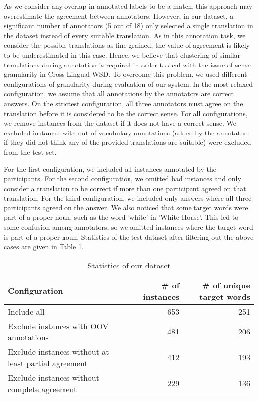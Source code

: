 {As we consider any overlap in annotated labels to be a match, this approach may overestimate the agreement between annotators. However, in our dataset, a significant number of annotators (5 out of 18) only selected a single translation in the dataset instead of every suitable translation. As in this annotation task, we consider the possible translations as  fine-grained, the value of agreement is likely to be underestimated in this case. Hence, we believe that clustering of similar translations during annotation is required in order to deal with the issue of sense granularity in Cross-Lingual WSD. To overcome this problem, we used different configurations of granularity during evaluation of our system. In the most relaxed configuration, we assume that all annotations by the annotators are correct answers. On the strictest configuration, all three annotators must agree on the translation before it is considered to be the correct sense. For all configurations, we remove instances from the dataset if it does not have a correct sense. We excluded instances with out-of-vocabulary annotations (added by the annotators if they did not think any of the provided translations are suitable) were excluded from the test set.


For the first configuration, we included all instances annotated by the participants. For the second configuration, we omitted bad instances and only consider a translation to be correct if more than one participant agreed on that translation. For the third configuration, we included only answers where all three participants agreed on the answer. We also noticed that some target words were part of a proper noun, such as the word 'white' in 'White House'. This led to some confusion among annotators, so we omitted instances where the target word is part of a proper noun. Statistics of the test dataset after filtering out the above cases are given in Table \ref{table:CLWSD-test-stats-no-ne}.


\begin{table}[ht]
	\caption{Statistics of our dataset}
	\label{table:CLWSD-test-stats-no-ne}
	\begin{center}
		\begin{tabular}{| p{8cm} | r| r|}
			\hline
			Configuration & \# of instances & \# of unique target words \\
			\hline
			Include all & 653 & 251\\ 
			\hline
			Exclude instances with OOV annotations & 481 & 206 \\						
			\hline
			Exclude instances without at least partial agreement & 412 & 193 \\
			\hline
			Exclude instances without complete agreement & 229 & 136 \\
			\hline
		\end{tabular}
	\end{center}
\end{table}

}
